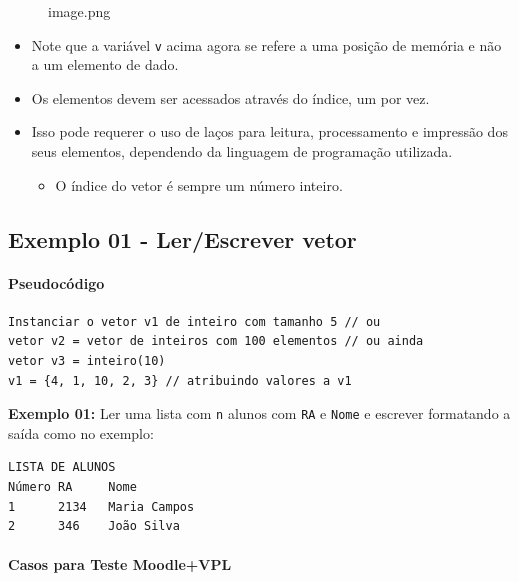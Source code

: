\documentclass[12pt,a4paper]{article}
\providecommand{\tightlist}{%
      \setlength{\itemsep}{0pt}\setlength{\parskip}{0pt}}
\begin{document}
    \begin{figure}
\centering
\caption{image.png}
\end{figure}

    \begin{itemize}
\tightlist
\item
  Note que a variável \texttt{v} acima agora se refere a uma posição de
  memória e não a um elemento de dado.
\item
  Os elementos devem ser acessados através do índice, um por vez.
\item
  Isso pode requerer o uso de laços para leitura, processamento e
  impressão dos seus elementos, dependendo da linguagem de programação
  utilizada.

  \begin{itemize}
  \tightlist
  \item
    O índice do vetor é sempre um número inteiro.
  \end{itemize}
\end{itemize}

    \hypertarget{exemplo-01---lerescrever-vetor}{%
\subsection{Exemplo 01 - Ler/Escrever
vetor}\label{exemplo-01---lerescrever-vetor}}

    \hypertarget{pseudocuxf3digo}{%
\paragraph{Pseudocódigo}\label{pseudocuxf3digo}}

    \begin{verbatim}
Instanciar o vetor v1 de inteiro com tamanho 5 // ou
vetor v2 = vetor de inteiros com 100 elementos // ou ainda
vetor v3 = inteiro(10)
v1 = {4, 1, 10, 2, 3} // atribuindo valores a v1
\end{verbatim}

    \textbf{Exemplo 01:} Ler uma lista com \texttt{n} alunos com \texttt{RA}
e \texttt{Nome} e escrever formatando a saída como no exemplo:

    \begin{verbatim}
LISTA DE ALUNOS
Número RA     Nome
1      2134   Maria Campos
2      346    João Silva
\end{verbatim}

    \hypertarget{casos-para-teste-moodlevpl}{%
\paragraph{Casos para Teste
Moodle+VPL}\label{casos-para-teste-moodlevpl}}
\end{document}
